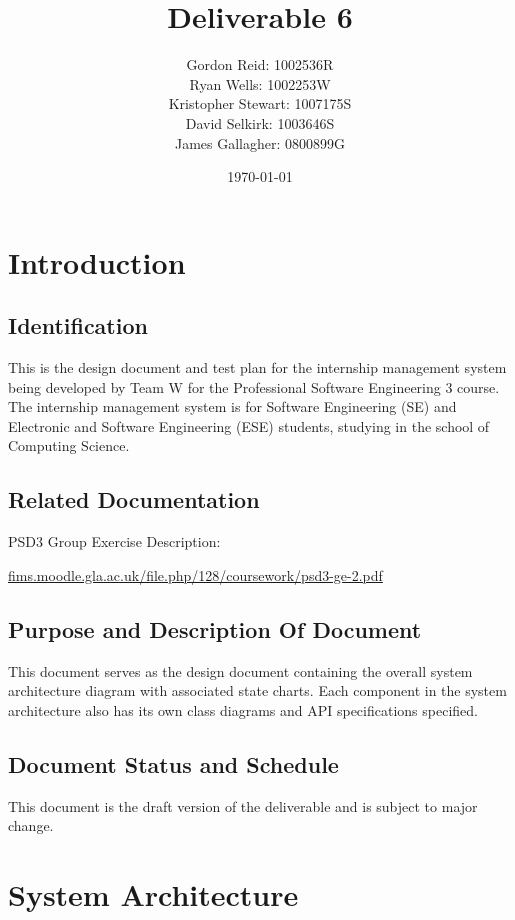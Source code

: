 \documentclass[11pt]{article}
\title{Deliverable 6}
\author{
    Gordon Reid: 1002536R\\
    Ryan Wells: 1002253W\\
    Kristopher Stewart: 1007175S\\
    David Selkirk: 1003646S\\
    James Gallagher: 0800899G\\
}
\date{\today}
\begin{document}
\maketitle

\newpage

\tableofcontents

\newpage

\section{Introduction}

\subsection{Identification}

This is the design document and test plan for the internship management system
being developed by Team W for the Professional Software Engineering 3 course.
The internship management system is for Software Engineering (SE) and Electronic
and Software Engineering (ESE) students, studying in the school of Computing
Science.

\subsection{Related Documentation}

PSD3 Group Exercise Description:

\url{fims.moodle.gla.ac.uk/file.php/128/coursework/psd3-ge-2.pdf}

\subsection{Purpose and Description Of Document}

This document serves as the design document containing the overall system
architecture diagram with associated state charts. Each component in the
system architecture also has its own class diagrams and API specifications
specified.

\subsection{Document Status and Schedule}

This document is the draft version of the deliverable and is subject to major
change.

\newpage

\section{System Architecture}
\end{document}
